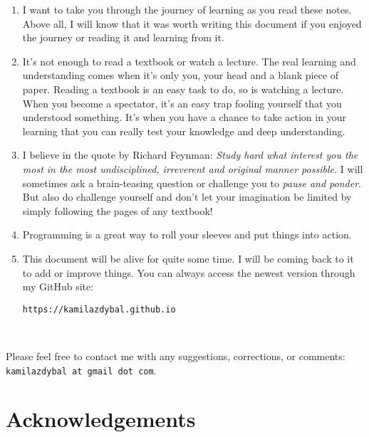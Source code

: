 \documentclass[12pt]{report}
\begin{document}
\begin{enumerate}
\item I want to take you through the journey of learning as you read these notes. Above all, I will know that it was worth writing this document if you enjoyed the journey or reading it and learning from it.
\item It's not enough to read a textbook or watch a lecture. The real learning and understanding comes when it's only you, your head and a blank piece of paper. Reading a textbook is an easy task to do, so is watching a lecture. When you become a spectator, it's an easy trap  fooling yourself that you understood something. It's when you have a chance to take action in your learning that you can really test your knowledge and deep understanding.
\item I believe in the quote by Richard Feynman: \textit{Study hard what interest you the most in the most undisciplined, irreverent and original manner possible.} I will sometimes ask a brain-teasing question or challenge you to \textit{pause and ponder}. But also do challenge yourself and don't let your imagination be limited by simply following the pages of any textbook!
\item Programming is a great way to roll your sleeves and put things into action.
\item This document will be alive for quite some time. I will be coming back to it to add or improve things. You can always access the newest version through my GitHub site:

\verb|https://kamilazdybal.github.io|
\end{enumerate}

\,\,

Please feel free to contact me with any suggestions, corrections, or comments: \verb|kamilazdybal at gmail dot com|.


\newpage
\chapter*{Acknowledgements}
\thispagestyle{empty}

{\fontsize{12}{12}}

\vspace*{0.5cm}

{\fontsize{12}{12}}

\vspace*{0.5cm}
\end{document}
